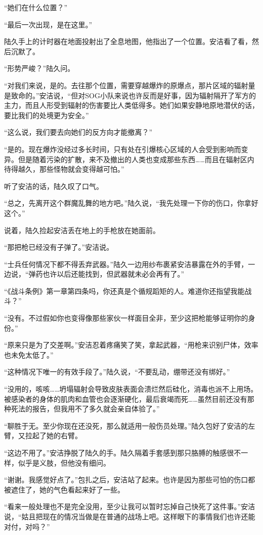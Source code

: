 “她们在什么位置？”

“最后一次出现，是在这里。”

陆久手上的计时器在地面投射出了全息地图，他指出了一个位置。安洁看了看，然后沉默了。

“形势严峻？”陆久问。

“对我们来说，是的。去往那个位置，需要穿越爆炸的原爆点，那片区域的辐射量是致命的。”安洁说，“但对SOG小队来说也许反而是好事，因为辐射隔开了军方的主力，而且人形受到辐射的伤害要比人类低得多。她们如果安静地原地潜伏的话，要比我们的处境更为安全。”

“这么说，我们要去向她们的反方向才能撤离？”

“是的。现在爆炸没经过多长时间，只有处在引爆核心区域的人会受到影响而变异。但是随着污染的扩散，来不及撤出的人类也变成那些东西……而且在辐射区内待得越久，那些怪物就会变得越可怕。”

听了安洁的话，陆久叹了口气。

“总之，先离开这个群魔乱舞的地方吧。”陆久说，“我先处理一下你的伤口，你拿好这个。”

说着，陆久捡起安洁丢在地上的手枪放在她面前。

“那把枪已经没有子弹了。”安洁说。

“士兵任何情况下都不得丢弃武器。”陆久一边用纱布裹紧安洁暴露在外的手臂，一边说，“弹药也许以后还能找到，但武器就未必会再有了。”

“《战斗条例》第一章第四条吗，你还真是个循规蹈矩的人。难道你还指望我能战斗？”

“没有。不过假如你也变得像那些家伙一样面目全非，至少这把枪能够证明你的身份。”

“原来只是为了交差啊。”安洁忍着疼痛笑了笑，拿起武器，“用枪来识别尸体，效率也未免太低了。”

“这种情况下唯一的有效手段了。”陆久说，“不要乱动，绷带还没有绑好。”

“没用的，咳咳……坍塌辐射会导致皮肤表面会溃烂然后硅化，消毒也派不上用场。被感染者的身体的肌肉和血管也会逐渐硬化，最后衰竭而死……虽然目前还没有那种死法的报告，但我用不了多久就会亲自体验了。”

“聊胜于无。至少你现在还没死，那么就适用一般伤员处理。”陆久包好了安洁的左臂，又拉起了她的右臂。

“这边不用了。”安洁挣脱了陆久的手。陆久隔着手套感到那只胳膊的触感很不一样，似乎是义肢，但他没有细问。

“谢谢。我感觉好点了。”包扎之后，安洁站了起来。也许是因为那些可怕的伤口都被遮住了，她的气色看起来好了一些。

“看来一般处理也不是完全没用，至少让我可以暂时忘掉自己快死了这件事。”安洁说，“姑且把现在的情况当做是在普通的战场上吧。这样眼下的事情我们也许还能对付，对吗？”

